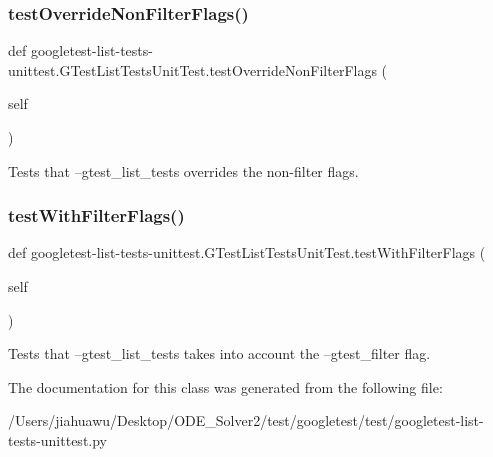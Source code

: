 \subsubsection{\texorpdfstring{test\+Override\+Non\+Filter\+Flags()}{testOverrideNonFilterFlags()}}
{\footnotesize\ttfamily def googletest-\/list-\/tests-\/unittest.\+G\+Test\+List\+Tests\+Unit\+Test.\+test\+Override\+Non\+Filter\+Flags (\begin{DoxyParamCaption}\item[{}]{self }\end{DoxyParamCaption})}

\begin{DoxyVerb}Tests that --gtest_list_tests overrides the non-filter flags.\end{DoxyVerb}
 \mbox{\label{classgoogletest-list-tests-unittest_1_1_g_test_list_tests_unit_test_adb60d2295fee8ed4af2a5ee1a32e5778}} 
\subsubsection{\texorpdfstring{test\+With\+Filter\+Flags()}{testWithFilterFlags()}}
{\footnotesize\ttfamily def googletest-\/list-\/tests-\/unittest.\+G\+Test\+List\+Tests\+Unit\+Test.\+test\+With\+Filter\+Flags (\begin{DoxyParamCaption}\item[{}]{self }\end{DoxyParamCaption})}

\begin{DoxyVerb}Tests that --gtest_list_tests takes into account the
--gtest_filter flag.\end{DoxyVerb}
 

The documentation for this class was generated from the following file\+:\begin{DoxyCompactItemize}
\item 
/\+Users/jiahuawu/\+Desktop/\+O\+D\+E\+\_\+\+Solver2/test/googletest/test/googletest-\/list-\/tests-\/unittest.\+py\end{DoxyCompactItemize}
